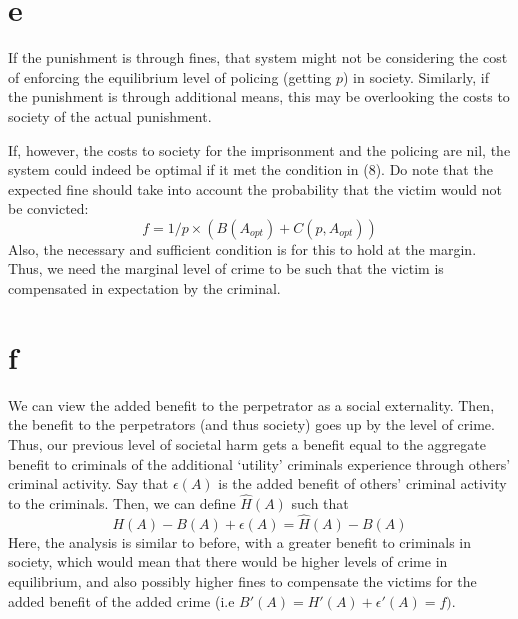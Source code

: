 \documentclass[12pt]{paper}
\begin{document}
\section*{e}
If the punishment is through fines, that system might not be
considering the cost of enforcing the equilibrium level of policing
(getting $p$) in society. Similarly, if the punishment is through
additional means, this may be overlooking the costs to society of the
actual punishment. \par 
If, however, the costs to society for the imprisonment and the
policing are nil, the system could indeed be optimal if it met the
condition in (8). Do note that the expected fine should take into
account the probability that the victim would not be convicted: $$ f =
1/p \times (B(A_{opt})  + C(p,A_{opt})) $$ Also, the necessary and
sufficient condition is for this to hold at the margin. Thus, we need
the marginal level of crime to be such that the victim is compensated
in expectation by the criminal.   
\section*{f}
We can view the added benefit to the perpetrator as a social
externality. Then, the benefit to the perpetrators (and thus society)
goes up by the level of crime. Thus, our previous level of societal
harm gets a benefit equal to the aggregate benefit to criminals of the
additional `utility' criminals experience through others' criminal
activity. Say that $\epsilon(A)$ is the added benefit of others' criminal
activity to the criminals. Then, we can define $\hat H(A)$ such that  
 $$H(A) - B(A) + \epsilon(A) = \hat H(A) - B(A)$$ 
 Here, the analysis is similar to before, with a greater benefit to
 criminals in society, which would mean that there would be higher
 levels of crime in equilibrium, and also possibly higher fines to
 compensate the victims for the added benefit of the added crime (i.e
 $B'(A) = H'(A) + \epsilon '(A) = f)$.
 
\end{document}

